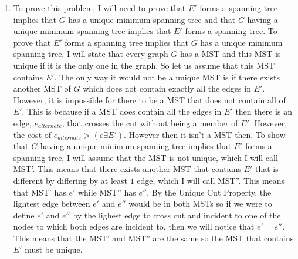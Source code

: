 \documentclass[11pt]{article}
\begin{document}
\begin{enumerate}[label=(\alph*)]
\item
To prove this problem, I will need to prove that $E'$ forms a spanning tree implies that $G$ has a unique minimum spanning tree and that $G$ having a unique minimum spanning tree implies that $E'$ forms a spanning tree. To prove that $E'$ forms a spanning tree implies that $G$ has a unique minimum spanning tree, I will state that every graph $G$ has a MST and this MST is unique if it is the only one in the graph. So let us assume that this MST contains $E'$. The only way it would not be a unique MST is if there exists another MST of $G$ which does not contain exactly all the edges in $E'$. However, it is impossible for there to be a MST that does not contain all of $E'$. This is because if a MST does contain all the edges in $E'$ then there is an edge, $e_{alternate}$, that crosses the cut without being a member of $E'$. However, the cost of $e_{alternate} > (e \exists E')$. However then it isn't a MST then. To show that $G$ having a unique minimum spanning tree implies that $E'$ forms a spanning tree, I will assume that the MST is not unique, which I will call MST'. This means that there exists another MST that contains $E'$ that is different by differing by at least $1$ edge, which I will call MST''. This means that MST' has $e'$ while MST'' has $e''$. By the Unique Cut Property, the lightest edge between $e'$ and $e''$ would be in both MSTs so if we were to define $e'$ and $e''$ by the lighest edge to cross cut and incident to one of the nodes to which both edges are incident to, then we will notice that $e' = e''$. This means that the MST' and MST'' are the same so the MST that contains $E'$ must be unique.


\end{enumerate}
\end{document}
